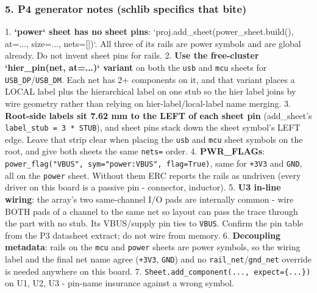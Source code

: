 \documentclass[11pt,a4paper]{article}
\begin{document}
\subsubsection*{5. P4 generator notes (schlib specifics that bite)}
1. \textbf{`power` sheet has no sheet pins}: `proj.add\_sheet(power\_sheet.build(), at=..., size=..., nets={[}{]})`. All three of its rails are power symbols and are global already. Do not invent sheet pins for rails. 2. \textbf{Use the free-cluster `hier\_pin(net, at=...)` variant} on both the \texttt{usb} and \texttt{mcu} sheets for \texttt{USB\_DP}/\texttt{USB\_DM}. Each net has 2+ components on it, and that variant places a LOCAL label plus the hierarchical label on one stub so the hier label joins by wire geometry rather than relying on hier-label/local-label name merging. 3. \textbf{Root-side labels sit 7.62 mm to the LEFT of each sheet pin} (add\_sheet's \texttt{label\_stub = 3 {*} STUB}), and sheet pins stack down the sheet symbol's LEFT edge. Leave that strip clear when placing the \texttt{usb} and \texttt{mcu} sheet symbols on the root, and give both sheets the same \texttt{nets=} order. 4. \textbf{PWR\_FLAGs}: \texttt{power\_flag("VBUS", sym="power:VBUS", flag=True)}, same for \texttt{+3V3} and \texttt{GND}, all on the \texttt{power} sheet. Without them ERC reports the rails as undriven (every driver on this board is a passive pin - connector, inductor). 5. \textbf{U3 in-line wiring}: the array's two same-channel I/O pads are internally common - wire BOTH pads of a channel to the same net so layout can pass the trace through the part with no stub. Its VBUS/supply pin ties to \texttt{VBUS}. Confirm the pin table from the P3 datasheet extract; do not wire from memory. 6. \textbf{Decoupling metadata}: rails on the \texttt{mcu} and \texttt{power} sheets are power symbols, so the wiring label and the final net name agree (\texttt{+3V3}, \texttt{GND}) and no \texttt{rail\_net}/\texttt{gnd\_net} override is needed anywhere on this board. 7. \texttt{Sheet.add\_component(..., expect=\{...\})} on U1, U2, U3 - pin-name insurance against a wrong symbol.
\end{document}
